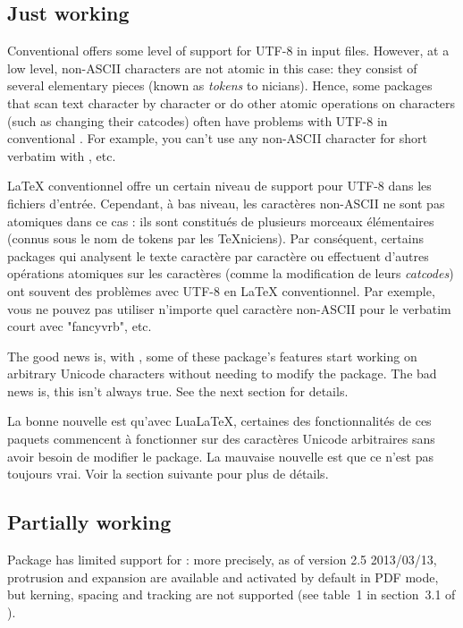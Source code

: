 \documentclass{lltxdoc}
\begin{document}
\subsection{Just working}\label{working}

Conventional \latex offers some level of support for UTF-8 in input files.
However, at a low level, non-ASCII characters are not atomic in this case:
they consist of several elementary pieces (known as \emph{tokens} to
\tex{}nicians). Hence, some packages that scan text character by character or
do other atomic operations on characters (such as changing their catcodes)
often have problems with UTF-8 in conventional \latex. For example, you can't
use any non-ASCII character for short verbatim with , etc.

LaTeX conventionnel offre un certain niveau de support pour UTF-8 dans les fichiers d'entrée. Cependant, à bas niveau, les caractères non-ASCII ne sont pas atomiques dans ce cas : ils sont constitués de plusieurs morceaux élémentaires (connus sous le nom de tokens par les TeXniciens). Par conséquent, certains packages qui analysent le texte caractère par caractère ou effectuent d'autres opérations atomiques sur les caractères (comme la modification de leurs \emph{catcodes}) ont souvent des problèmes avec UTF-8 en LaTeX conventionnel. Par exemple, vous ne pouvez pas utiliser n'importe quel caractère non-ASCII pour le verbatim court avec "fancyvrb", etc.

The good news is, with \lualatex, some of these package's features start
working on arbitrary Unicode characters without needing to modify the package.
The bad news is, this isn't always true. See the next section for details.

La bonne nouvelle est qu'avec LuaLaTeX, certaines des fonctionnalités de ces paquets commencent à fonctionner sur des caractères Unicode arbitraires sans avoir besoin de modifier le package. La mauvaise nouvelle est que ce n'est pas toujours vrai. Voir la section suivante pour plus de détails.

\subsection{Partially working}\label{partial}

Package  has limited support for \luatex: more precisely, as of
version 2.5 2013/03/13, protrusion and expansion are available and activated
by default in PDF mode, but kerning, spacing and tracking are not supported
(see table~1 in section~3.1 of ).
\end{document}
